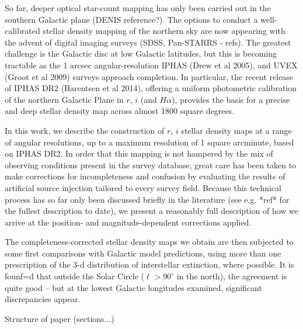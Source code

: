 \documentclass[a4paper,useAMS,usenatbib]{mn2e}
\begin{document}
So far, deeper optical star-count mapping has only been carried out in the 
southern Galactic plane (DENIS reference?).  The options to conduct a 
well-calibrated stellar density mapping of the northern sky are now 
appearing with the advent of digital imaging surveys (SDSS, Pan-STARRS - 
refs).  The greatest challenge is the Galactic disc at low Galactic latitudes, 
but this is becoming tractable as the 1 arcsec angular-resolution IPHAS (Drew 
et al 2005), and UVEX (Groot et al 2009) surveys approach completion.  In 
particular, the 
recent release of IPHAS DR2 (Barentsen et al 2014), offering a uniform 
photometric calibration of the northern Galactic Plane in $r$, $i$ (and 
$H\alpha$), provides the basis for a precise and deep stellar density map 
across almost 1800 square degrees.

In this work, we describe the construction of $r$, $i$ stellar density maps at
a range of angular resolutions, up to a maximum resolution of 1 square arcminute, 
based on IPHAS DR2.  In order that this mapping is not hampered by the mix of 
observing conditions present in the survey database, great care has been 
taken to make corrections for incompleteness and confusion by evaluating the 
results of artificial source injection tailored to every survey field. Because 
this technical process has so far only been discussed briefly in the 
literature (see e.g. *ref* for the fullest description to date), we present a 
reasonably full description of how we arrive at the position- and 
magnitude-dependent corrections applied. 

The completeness-corrected stellar density maps we obtain are then subjected 
to some first comparisons with Galactic model predictions, using more than one 
prescription of the 3-d distribution of interstellar extinction, where possible.  
It is founf=d that outside the Solar Circle ($\ell > 90^{\circ}$ in the north), the 
agreement is quite good -- but at the lowest Galactic longitudes examined, 
significant discrepancies appear.

Structure of paper (sections...)
\end{document}
